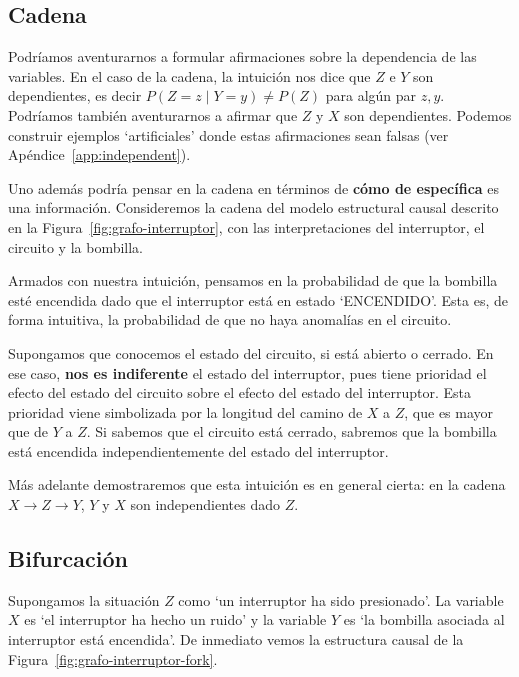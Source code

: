 \documentclass[a4paper,11pt,spanish, twoside]{tfg-uam-matematicas_25-26}
\theoremstyle{definition}
\begin{document}
\subsection{Cadena}
Podríamos aventurarnos a formular afirmaciones sobre la dependencia de las variables. En el caso de la cadena, la intuición nos dice que $Z$ e $Y$ son dependientes, es decir $P(Z = z \mid Y = y) \neq P(Z)$ para algún par $z, y$. Podríamos también aventurarnos a afirmar que $Z$ y $X$ son dependientes. Podemos construir ejemplos `artificiales' donde estas afirmaciones sean falsas (ver Apéndice~\ref{app:independent}).

Uno además podría pensar en la cadena en términos de \textbf{cómo de específica} es una información. Consideremos la cadena del modelo estructural causal descrito en la Figura~\ref{fig:grafo-interruptor}, con las interpretaciones del interruptor, el circuito y la bombilla.

Armados con nuestra intuición, pensamos en la probabilidad de que la bombilla esté encendida dado que el interruptor está en estado `ENCENDIDO'. Esta es, de forma intuitiva, la probabilidad de que no haya anomalías en el circuito.

Supongamos que conocemos el estado del circuito, si está abierto o cerrado. En ese caso, \textbf{nos es indiferente} el estado del interruptor, pues tiene prioridad el efecto del estado del circuito sobre el efecto del estado del interruptor. Esta prioridad viene simbolizada por la longitud del camino de $X$ a $Z$, que es mayor que de $Y$ a $Z$. Si sabemos que el circuito está cerrado, sabremos que la bombilla está encendida independientemente del estado del interruptor.

Más adelante demostraremos que esta intuición es en general cierta: en la cadena $X \rightarrow Z \rightarrow Y$, $Y$ y $X$ son independientes dado $Z$.

\subsection{Bifurcación}
Supongamos la situación $Z$ como `un interruptor ha sido presionado'. La variable $X$ es `el interruptor ha hecho un ruido' y la variable $Y$ es `la bombilla asociada al interruptor está encendida'. De inmediato vemos la estructura causal de la Figura~\ref{fig:grafo-interruptor-fork}.
\end{document}
